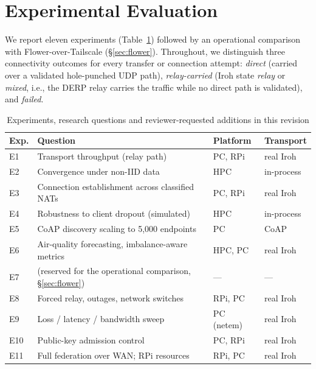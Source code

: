 \section{Experimental Evaluation}
\label{sec:evaluation}

We report eleven experiments (Table~\ref{tab:explist}) followed by an operational comparison with Flower-over-Tailscale (\S\ref{sec:flower}). Throughout, we distinguish three connectivity outcomes for every transfer or connection attempt: \emph{direct} (carried over a validated hole-punched UDP path), \emph{relay-carried} (Iroh state \emph{relay} or \emph{mixed}, i.e., the DERP relay carries the traffic while no direct path is validated), and \emph{failed}.

\begin{table}[t]
\centering
\caption{Experiments, research questions and reviewer-requested additions in this revision}
\label{tab:explist}
\scriptsize
\setlength{\tabcolsep}{2.5pt}
\begin{tabular}{@{}l p{4.1cm} l l@{}}
\toprule
\textbf{Exp.} & \textbf{Question} & \textbf{Platform} & \textbf{Transport} \\
\midrule
E1 & Transport throughput (relay path) & PC, RPi & real Iroh \\
E2 & Convergence under non-IID data & HPC & in-process \\
E3 & Connection establishment across classified NATs & PC, RPi & real Iroh \\
E4 & Robustness to client dropout (simulated) & HPC & in-process \\
E5 & CoAP discovery scaling to 5{,}000 endpoints & PC & CoAP \\
E6 & Air-quality forecasting, imbalance-aware metrics & HPC, PC & real Iroh \\
E7 & (reserved for the operational comparison, \S\ref{sec:flower}) & --- & --- \\
E8 & Forced relay, outages, network switches & RPi, PC & real Iroh \\
E9 & Loss / latency / bandwidth sweep & PC (netem) & real Iroh \\
E10 & Public-key admission control & PC, RPi & real Iroh \\
E11 & Full federation over WAN; RPi resources & RPi, PC & real Iroh \\
\bottomrule
\end{tabular}
\end{table}

